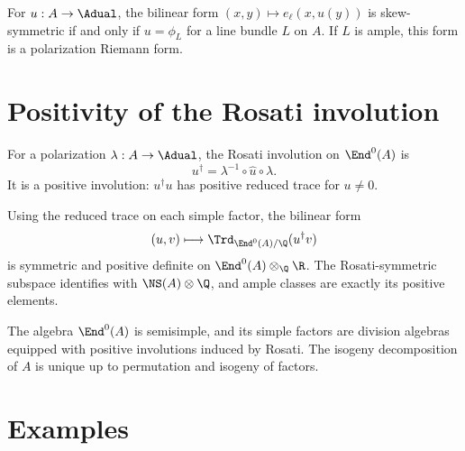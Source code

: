 \begin{theorem}
\label{mumford-thm-riemann-form-hom}
For $u:A\to\Adual$, the bilinear form
$(x,y)\mapsto e_\ell(x,u(y))$ is skew-symmetric if and only if
$u=\phi_L$ for a line bundle $L$ on $A$.  If $L$ is ample, this form is a
polarization Riemann form.
\notready
\end{theorem}

\section[Positivity of Rosati]{Positivity of the Rosati involution}
\label{mumford-IV21}

\begin{definition}
\label{mumford-def-rosati}
For a polarization $\lambda:A\to\Adual$, the Rosati involution on
$\End^0(A)$ is
\[
 u^\dagger=\lambda^{-1}\circ\widehat u\circ\lambda.
\]
It is a positive involution: $u^\dagger u$ has positive reduced trace for
$u\ne0$.
\notready
\end{definition}

\begin{theorem}
\label{mumford-thm-rosati-positive}
Using the reduced trace on each simple factor, the bilinear form
\[
 (u,v)\longmapsto\Trd_{\End^0(A)/\Q}(u^\dagger v)
\]
is symmetric and positive definite on $\End^0(A)\otimes_\Q\R$.  The
Rosati-symmetric subspace identifies with $\NS(A)\otimes\Q$, and ample classes
are exactly its positive elements.
\notready
\end{theorem}

\begin{corollary}
\label{mumford-cor-semisimple-endomorphism}
The algebra $\End^0(A)$ is semisimple, and its simple factors are division
algebras equipped with positive involutions induced by Rosati.  The isogeny
decomposition of $A$ is unique up to permutation and isogeny of factors.
\notready
\end{corollary}

\section{Examples}
\label{mumford-IV22}


